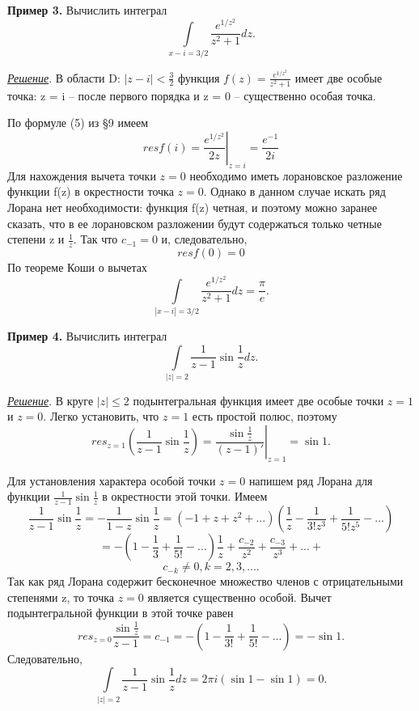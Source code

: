 \documentclass[a4paper,12pt]{article}
\begin{document}
\textbf{Пример 3.} Вычислить интеграл
\[ \int\limits_{x-i=3/2} \frac{e^{1/z^2}}{z^2+1} dz.\]

\underline{\textit{Решение}}. В области D: $|z-i| < \frac{3}{2}$ функция $f(z) = \frac{e^{1/z^2}}{z^2+1}$ имеет две особые точка: z = i -- после первого порядка и z = 0 --  существенно особая точка.

По формуле (5) из \S 9 имеем 
\[ \left.res f(i) = \frac{e^{1/z^2}}{2z}\right|_{z=i} = \frac{e^{-1}}{2i}\]
Для нахождения вычета точки $z = 0$ необходимо иметь лорановское разложение функции f(z) в окрестности точка $z = 0$. Однако в данном случае искать ряд Лорана нет необходимости: функция f(z) четная, и поэтому можно заранее сказать, что в ее лорановском разложении будут содержаться только четные степени z и $\frac{1}{z}$. Так что $c_{-1} = 0$ и, следовательно,
\[ resf(0) = 0\]
По теореме Коши о вычетах 
\[ \int\limits_{|x-i|=3/2} \frac{e^{1/z^2}}{z^2 + 1} dz = \frac{\pi}{e  }.\]

\textbf{Пример 4.} Вычислить интеграл
\[\int\limits_{|z| = 2} \frac{1}{z-1} \sin \frac{1}{z} dz.\]

\underline{\textit{Решение}}. В круге $|z| \leq 2$ подынтегральная функция имеет две особые точки $z = 1$ и $z = 0$. Легко установить, что $z = 1$ есть простой полюс, поэтому 
\[ res_{z=1} \left(\frac{1}{z-1} \sin \frac{1}{z} \right) = \left. \frac{\sin \frac{1}{z}}{(z-1)'}\right|_{z=1} = \sin 1.\]

Для установления характера особой точки $z = 0$ напишем ряд Лорана для функции $\frac{1}{z-1} \sin\frac{1}{z}$ в окрестности этой точки. Имеем
\[\frac{1}{z-1} \sin \frac{1}{z} = -\frac{1}{1-z} \sin \frac{1}{z} = (-1+z+z^2+...)\left(\frac{1}{z} - \frac{1}{3!z^3} + \frac{1}{5!z^5}-...\right)\]
\[ = -\left(1 - \frac{1}{3} + \frac{1}{5!} - ...\right) \frac{1}{z} + \frac{c_{-2}}{z^2} + \frac{c_{-3}}{z^3}+...+\]
\[c_{-k} \neq 0, k = 2,3,... .\]
Так как ряд Лорана содержит бесконечное множество членов с отрицательными степенями z, то точка $z = 0$ является существенно особой. Вычет подынтегральной функции в этой точке равен
\[ res_{z=0} \frac{\sin \frac{1}{z}}{z-1} = c_{-1} = -\left(1 - \frac{1}{3!} + \frac{1}{5!} - ...\right) = - \sin 1.\]
Следовательно,
\[ \int\limits_{|z|=2} \frac{1}{z-1} \sin \frac{1}{z} dz = 2\pi i(\sin 1 - \sin 1) = 0.\]
\end{document}
